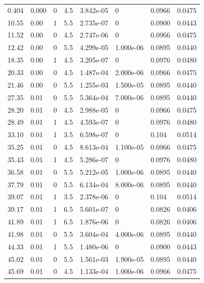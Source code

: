 \documentclass[preview]{standalone}
\begin{document}
{{\begin{tabular}{L{1.2cm}C{1.2cm} C{0.3cm}C{0.5cm} C{1.4cm}C{1.4cm} C{1.4cm}C{1.4cm}}
  0.404  &  0.000  & 0     & 4.5 &  3.842e-05  & 0  & 0.0966 &  0.0475   \\ 
  10.55  &  0.00  & 1     & 5.5 &  2.735e-07  & 0  & 0.0900 &  0.0443   \\ 
  11.52  &  0.00  & 0     & 4.5 &  2.747e-06  & 0  & 0.0966 &  0.0475   \\ 
  12.42  &  0.00  & 0     & 5.5 &  4.299e-05  & 1.000e-06  & 0.0895 &  0.0440   \\ 
  18.35  &  0.00  & 1     & 4.5 &  3.205e-07  & 0  & 0.0976 &  0.0480   \\ 
  20.33  &  0.00  & 0     & 4.5 &  1.487e-04  & 2.000e-06  & 0.0966 &  0.0475   \\ 
  21.46  &  0.00  & 0     & 5.5 &  1.255e-03  & 1.500e-05  & 0.0895 &  0.0440   \\ 
  27.35  &  0.01  & 0     & 5.5 &  5.364e-04  & 7.000e-06  & 0.0895 &  0.0440   \\ 
  28.20  &  0.01  & 0     & 4.5 &  2.988e-05  & 0  & 0.0966 &  0.0475   \\ 
  28.49  &  0.01  & 1     & 4.5 &  4.593e-07  & 0  & 0.0976 &  0.0480   \\ 
  33.10  &  0.01  & 1     & 3.5 &  6.598e-07  & 0  & 0.104 &  0.0514   \\ 
  35.25  &  0.01  & 0     & 4.5 &  8.613e-04  & 1.100e-05  & 0.0966 &  0.0475   \\ 
  35.43  &  0.01  & 1     & 4.5 &  5.286e-07  & 0  & 0.0976 &  0.0480   \\ 
  36.58  &  0.01  & 0     & 5.5 &  5.212e-05  & 1.000e-06  & 0.0895 &  0.0440   \\ 
  37.79  &  0.01  & 0     & 5.5 &  6.134e-04  & 8.000e-06  & 0.0895 &  0.0440   \\ 
  39.07  &  0.01  & 1     & 3.5 &  2.378e-06  & 0  & 0.104 &  0.0514   \\ 
  39.17  &  0.01  & 1     & 6.5 &  5.601e-07  & 0  & 0.0826 &  0.0406   \\ 
  41.89  &  0.01  & 1     & 6.5 &  1.876e-06  & 0  & 0.0826 &  0.0406   \\ 
  41.98  &  0.01  & 0     & 5.5 &  3.604e-04  & 4.000e-06  & 0.0895 &  0.0440   \\ 
  44.33  &  0.01  & 1     & 5.5 &  1.480e-06  & 0  & 0.0900 &  0.0443   \\ 
  45.02  &  0.01  & 0     & 5.5 &  1.561e-03  & 1.900e-05  & 0.0895 &  0.0440   \\ 
  45.69  &  0.01  & 0     & 4.5 &  1.133e-04  & 1.000e-06  & 0.0966 &  0.0475   \\ 

\end{tabular}}}
\end{document}
